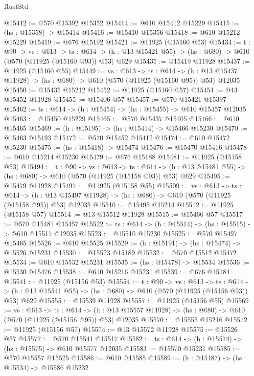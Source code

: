 \begin{lexlean}{RustStd}
\begin{coremodule}
@15412 := @570 @15392 @15352
@15414 := @610 @15412 @15229
@15415 := (hs : @15358) -> @15414
@15416 := @15410 @15356
@15418 := @610 @15212 @15229
@15419 := @676 @15192
@15421 := @11925 (@15160 @53)
@15434 := {t : @90} ->
  {vs : @613} ->
  {ts : @614} -> (h : @13 @15421 @55) -> (hs : @680) -> @610 (@570 (@11925 (@15160 @93)) @53) @629
@15435 := @15419 @11928
@15437 := @11925 (@15160 @55)
@15449 := {vs : @613} ->
  {ts : @614} ->
  (h : @13 @15437 @11928) -> (hs : @680) -> @610 (@570 (@11925 (@15160 @95)) @53) @12035
@15450 := @15435 @15212
@15452 := @11925 (@15160 @57)
@15454 := @13 @15452 @11928
@15455 := @15406 @57
@15457 := @570 @15421 @15397
@15462 := {ts : @614} -> (h : @15454) -> (hs : @15455) -> @610 @15457 @12035
@15463 := @15450 @15229
@15465 := @570 @15437 @15405
@15466 := @610 @15465
@15469 := (h : @15195) -> (hs : @15414) -> @15466 @15230
@15470 := @15463 @15193
@15472 := @570 @15452 @15412
@15474 := @610 @15472 @15230
@15475 := (hs : @15418) -> @15474
@15476 := @15470 @15416
@15478 := @610 @15214 @15230
@15479 := @676 @15188
@15481 := @11925 (@15158 @53)
@15494 := {t : @90} ->
  {vs : @613} ->
  {ts : @614} -> (h : @13 @15481 @55) -> (hs : @680) -> @610 (@570 (@11925 (@15158 @93)) @53) @629
@15495 := @15479 @11928
@15497 := @11925 (@15158 @55)
@15509 := {vs : @613} ->
  {ts : @614} ->
  (h : @13 @15497 @11928) -> (hs : @680) -> @610 (@570 (@11925 (@15158 @95)) @53) @12035
@15510 := @15495 @15214
@15512 := @11925 (@15158 @57)
@15514 := @13 @15512 @11928
@15515 := @15466 @57
@15517 := @570 @15481 @15457
@15522 := {ts : @614} -> (h : @15514) -> (hs : @15515) -> @610 @15517 @12035
@15523 := @15510 @15230
@15525 := @570 @15497 @15465
@15526 := @610 @15525
@15529 := (h : @15191) -> (hs : @15474) -> @15526 @15231
@15530 := @15523 @15189
@15532 := @570 @15512 @15472
@15534 := @610 @15532 @15231
@15535 := (hs : @15478) -> @15534
@15536 := @15530 @15476
@15538 := @610 @15216 @15231
@15539 := @676 @15184
@15541 := @11925 (@15156 @53)
@15554 := {t : @90} ->
  {vs : @613} ->
  {ts : @614} -> (h : @13 @15541 @55) -> (hs : @680) -> @610 (@570 (@11925 (@15156 @93)) @53) @629
@15555 := @15539 @11928
@15557 := @11925 (@15156 @55)
@15569 := {vs : @613} ->
  {ts : @614} ->
  (h : @13 @15557 @11928) -> (hs : @680) -> @610 (@570 (@11925 (@15156 @95)) @53) @12035
@15570 := @15555 @15216
@15572 := @11925 (@15156 @57)
@15574 := @13 @15572 @11928
@15575 := @15526 @57
@15577 := @570 @15541 @15517
@15582 := {ts : @614} -> (h : @15574) -> (hs : @15575) -> @610 @15577 @12035
@15583 := @15570 @15231
@15585 := @570 @15557 @15525
@15586 := @610 @15585
@15589 := (h : @15187) -> (hs : @15534) -> @15586 @15232

\end{coremodule}
\end{lexlean}
